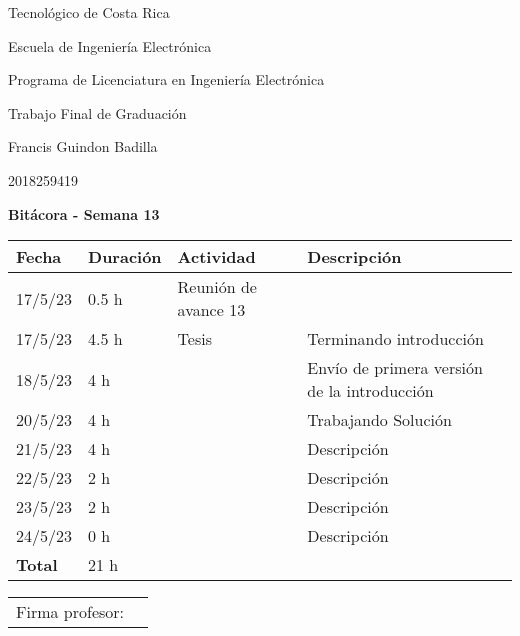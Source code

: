 \documentclass[12pt,oneside]{book}
\begin{document}
 \graphicspath{{./}{../tesis/fig/}}
  Tecnológico de Costa Rica
  \par\vspace{1mm}
  Escuela de Ingeniería Electrónica
  \par\vspace{1mm}
  Programa de Licenciatura en Ingeniería Electrónica
  \par\vspace{10mm}
  Trabajo Final de Graduación
  \par\vspace{1mm}
  Francis Guindon Badilla
  \par\vspace{1mm}
  2018259419
  \par\vspace{10mm}
  \large\textbf{Bitácora - Semana 13}
  \par\vspace{10mm}
  \small

  \begin{table} [!h]
    \centering
    \small
    \begin{tabular}{p{1.5 cm} p{2.1 cm} p{5 cm} p{8 cm}}
      \hline
      Fecha & Duración & Actividad & Descripción \\
      \hline
      17/5/23 & 0.5 h & Reunión de avance 13 & \\
      17/5/23 & 4.5 h & Tesis & Terminando introducción \\
      18/5/23 & 4 h & & Envío de primera versión de la introducción \\
      20/5/23 & 4 h & & Trabajando Solución \\
      21/5/23 & 4 h & & Descripción \\
      22/5/23 & 2 h & & Descripción \\
      23/5/23 & 2 h & & Descripción \\
      24/5/23 & 0 h & & Descripción \\
      \hline
      \textbf{Total} & 21 h \\
      \hline
    \end{tabular}
  \end{table}
  
  \vfill

  \begin{tabular}{p{3 cm} p{10 cm}}
    Firma profesor: & \\
    \cline{2-2}
  \end{tabular}
\end{document}
